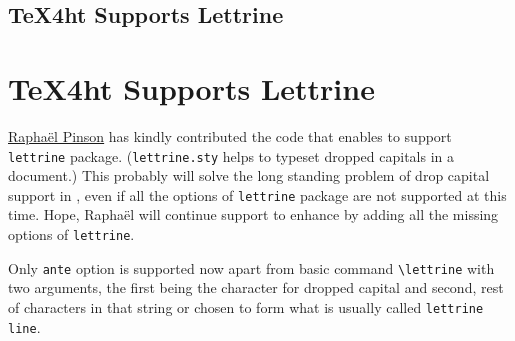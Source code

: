 \documentclass[a4paper]{article}
\let\hlink\href
\begin{document}
\section{\TeX4ht Supports Lettrine}
\else
\chapter{\TeX4ht Supports Lettrine}
\fi

\hlink{http://www.raphink.info}{Rapha\"el Pinson} has kindly
contributed the code that enables \texht to support \Verb=lettrine=
package. (\Verb=lettrine.sty= helps to typeset dropped capitals in a
\latex document.) This probably will solve the long standing problem
of drop capital support in \texht, even if all the options of
\Verb=lettrine= package are not supported at this time. Hope,
Rapha\"el will continue support to enhance \texht by adding all the
missing options of \Verb=lettrine=.

Only \Verb=ante= option is supported now apart from basic command
\Verb=\lettrine= with two arguments, the first being the character for
dropped capital and second, rest of characters in that string or
chosen to form what is usually called \Verb=lettrine line=.
\end{document}
